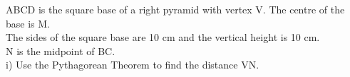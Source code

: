 \documentclass[preview]{standalone}
\begin{document}
\begin{center}
\begin{minipage}{12cm}\raggedright ABCD is the square base of a right pyramid with vertex V. The centre of the base is M.\\ The sides of the square base are 10 cm and the vertical height is 10 cm.\\ N is the midpoint of BC.\\ i) Use the Pythagorean Theorem to find the distance VN.\end{minipage}
\end{center}
\end{document}
